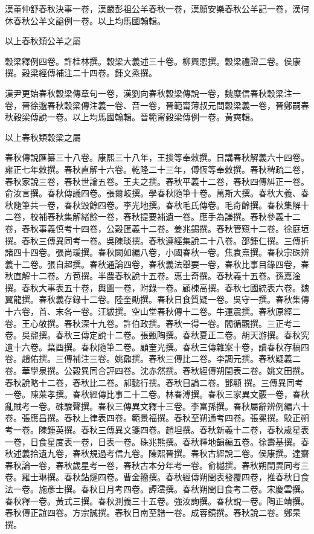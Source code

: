 \begin{pinyinscope}
漢董仲舒春秋決事一卷，漢嚴彭祖公羊春秋一卷，漢顏安樂春秋公羊記一卷，漢何休春秋公羊文謚例一卷。以上均馬國翰輯。

以上春秋類公羊之屬

穀梁釋例四卷。許桂林撰。穀梁大義述三十卷。柳興恩撰。穀梁禮證二卷。侯康撰。穀梁經傳補注二十四卷。鍾文烝撰。

漢尹更始春秋穀梁傳章句一卷，漢劉向春秋穀梁傳說一卷，魏糜信春秋穀梁注一卷，晉徐邈春秋穀梁傳注義一卷、音一卷，晉範甯薄叔元問穀梁義一卷，晉鄭嗣春秋穀梁傳說一卷。以上均馬國翰輯。晉範甯穀梁傳例一卷。黃奭輯。

以上春秋類穀梁之屬

春秋傳說匯纂三十八卷。康熙三十八年，王掞等奉敕撰。日講春秋解義六十四卷。雍正七年敕撰。春秋直解十六卷。乾隆二十三年，傅恆等奉敕撰。春秋稗疏二卷，春秋家說三卷，春秋世論五卷。王夫之撰。春秋平義十二卷，春秋四傳糾正一卷。俞汝言撰。春秋傳議四卷。張爾岐撰。學春秋隨筆十卷。萬斯大撰。春秋大義、春秋隨筆共一卷，春秋毀餘四卷。李光地撰。春秋毛氏傳卷。毛奇齡撰。春秋集解十二卷，校補春秋集解緒餘一卷，春秋提要補遺一卷。應手為謙撰。春秋參義十二卷，春秋事義慎考十四卷，公穀匯義十二卷。姜兆錫撰。春秋管窺十二卷。徐庭垣撰。春秋三傳異同考一卷。吳陳琰撰。春秋遵經集說二十八卷。邵鍾仁撰。三傳折諸四十四卷。張尚瑗撰。春秋闕如編八卷，小國春秋一卷。焦袁熹撰。春秋宗硃辨義十二卷。張自超撰。春秋通論四卷，春秋義法舉要一卷，春秋比事目錄四卷，春秋直解十二卷。方苞撰。半農春秋說十五卷。惠士奇撰。春秋義十五卷。孫嘉淦撰。春秋大事表五十卷，輿圖一卷，附錄一卷。顧棟高撰。春秋七國統表六卷。魏翼龍撰。春秋義存錄十二卷。陸奎勛撰。春秋日食質疑一卷。吳守一撰。春秋集傳十六卷，首、末各一卷。汪紱撰。空山堂春秋傳十二卷。牛運震撰。春秋原經二卷。王心敬撰。春秋深十九卷。許伯政撰。春秋一得一卷。閻循觀撰。三正考二卷。吳鼐撰。春秋三傳定說十二卷。張甄陶撰。春秋夏正二卷。胡天游撰。春秋究遺十六卷。葉酉撰。春秋隨筆二卷。顧奎光撰。春秋三傳雜案十卷，讀春秋存稿四卷。趙佑撰。三傳補注三卷。姚鼐撰。春秋三傳比二卷。李調元撰。春秋疑義二卷。華學泉撰。公穀異同合評四卷。沈赤然撰。春秋經傳朔閏表二卷。姚文田撰。春秋說略十二卷，春秋比二卷。郝懿行撰。春秋目論二卷。鄧顯撰。三傳異同考一卷。陳萊孝撰。春秋經傳比事二十二卷。林春溥撰。春秋三家異文覈一卷，春秋亂賊考一卷。硃駿聲撰。春秋三傳異文釋十三卷。李富孫撰。春秋屬辭辨例編六十卷。張應昌撰。春秋上律表四卷。範景福撰。春秋至朔通考四卷。張冕撰。駮正朔考一卷。陳鍾英撰。春秋三傳異文箋四卷。趙坦撰。春秋新義十二卷，春秋歲星表一卷，日食星度表一卷，日表一卷。硃兆熊撰。春秋釋地韻編五卷。徐壽基撰。春秋述義拾遺九卷，春秋規過考信九卷。陳熙晉撰。春秋古經說二卷。侯康撰。達齋春秋論一卷，春秋歲星考一卷，春秋古本分年考一卷。俞樾撰。春秋朔閏異同考三卷。羅士琳撰。春秋鉆燧四卷。曹金籀撰。春秋經傳朔閏表發覆四卷，推春秋日食法一卷。施彥士撰。春秋日月考四卷。譚澐撰。春秋朔閏日食考二卷。宋慶雲撰。春秋釋一卷。黃式三撰。春秋測義三十五卷。強汝詢撰。春秋說一卷。陶正靖撰。春秋傳正誼四卷。方宗誠撰。春秋日南至譜一卷。成蓉鏡撰。春秋說二卷。鄭杲撰。


\end{pinyinscope}
